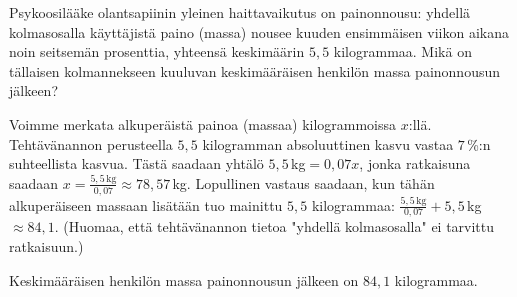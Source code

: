 %	


\begin{esimerkki}
Psykoosilääke olantsapiinin yleinen haittavaikutus on painonnousu: yhdellä kolmasosalla käyttäjistä paino (massa) nousee kuuden ensimmäisen viikon aikana noin seitsemän prosenttia, yhteensä keskimäärin $5,5$ kilogrammaa. Mikä on tällaisen kolmannekseen kuuluvan keskimääräisen henkilön massa painonnousun jälkeen?
	\begin{esimratk}
Voimme merkata alkuperäistä painoa (massaa) kilogrammoissa $x$:llä. Tehtävänannon perusteella $5,5$ kilogramman absoluuttinen kasvu vastaa $7$\,\%:n suhteellista kasvua. Tästä saadaan yhtälö $5,5\,$kg$=0,07x$, jonka ratkaisuna saadaan $x=\frac{5,5\,\textrm{kg}}{0,07}\approx78,57$\,kg. Lopullinen vastaus saadaan, kun tähän alkuperäiseen massaan lisätään tuo mainittu $5,5$ kilogrammaa: $\frac{5,5\,\textrm{kg}}{0,07}+5,5$\,kg$\approx84,1$. (Huomaa, että tehtävänannon tietoa "yhdellä kolmasosalla" ei tarvittu ratkaisuun.)
	\end{esimratk}
    \begin{esimvast}
    Keskimääräisen henkilön massa painonnousun jälkeen on $84,1$ kilogrammaa.
    \end{esimvast}
\end{esimerkki}



